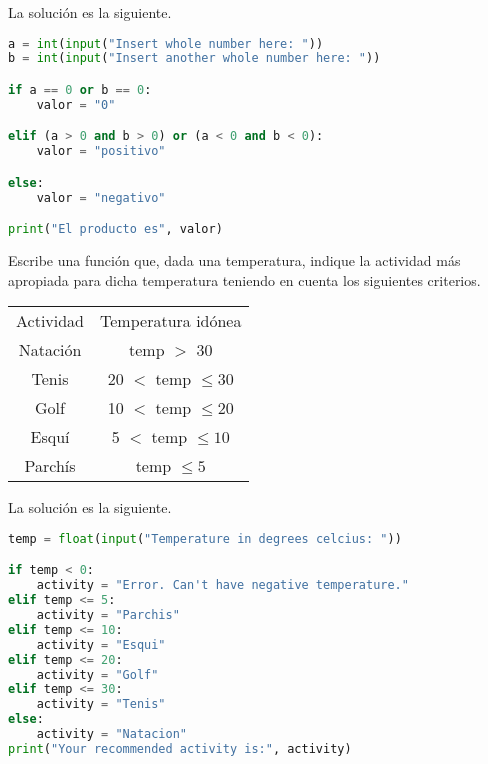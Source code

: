\documentclass{article}
\begin{document}
\begin{sol}
La solución es la siguiente.
\begin{lstlisting}[language = Python]
a = int(input("Insert whole number here: "))
b = int(input("Insert another whole number here: "))

if a == 0 or b == 0: 
	valor = "0"

elif (a > 0 and b > 0) or (a < 0 and b < 0):
	valor = "positivo"

else:
	valor = "negativo"

print("El producto es", valor)
\end{lstlisting}
\end{sol}

\begin{ej}
Escribe una función que, dada una temperatura, indique la actividad más apropiada para dicha temperatura teniendo en cuenta los siguientes criterios.
\begin{center}
\begin{tabular}{c c}
	Actividad & Temperatura idónea \\
	Natación & temp $\displaystyle > $  30 \\
	Tenis & 20 $\displaystyle < $  temp $\displaystyle \leq 30 $  \\
	Golf & 10 $\displaystyle < $  temp $\displaystyle \leq 20 $  \\
	Esquí & 5 $\displaystyle < $  temp $\displaystyle \leq 10 $ \\
	Parchís & temp $\displaystyle \leq 5 $ 
\end{tabular}
\end{center}
\end{ej}

\begin{sol}
La solución es la siguiente.
\begin{lstlisting}[language = Python]
temp = float(input("Temperature in degrees celcius: "))

if temp < 0: 
	activity = "Error. Can't have negative temperature."
elif temp <= 5: 
	activity = "Parchis"
elif temp <= 10:
	activity = "Esqui"
elif temp <= 20: 
	activity = "Golf"
elif temp <= 30:
	activity = "Tenis"
else:
	activity = "Natacion"
print("Your recommended activity is:", activity)
\end{lstlisting}
\end{sol}
\end{document}
